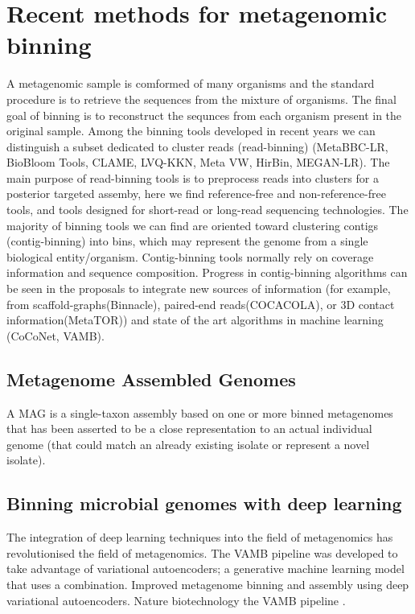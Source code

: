 \documentclass{article}
\begin{document}
\section*{Recent methods for metagenomic binning}
A metagenomic sample is comformed of many organisms and the standard procedure is to retrieve the sequences from the mixture of organisms.
The final goal of binning is to reconstruct the sequnces from each organism present in the original sample.
Among the binning tools developed in recent years we can distinguish a subset dedicated to cluster reads (read-binning) (MetaBBC-LR, BioBloom Tools, CLAME, LVQ-KKN, Meta VW, HirBin, MEGAN-LR).
The main purpose of read-binning tools is to preprocess reads into clusters for a posterior targeted assemby, here we find reference-free and non-reference-free tools, and tools designed for short-read or long-read sequencing technologies.
The majority of binning tools we can find are oriented toward clustering contigs (contig-binning) into bins, which may represent the genome from a single biological entity/organism.
Contig-binning tools normally rely on coverage information and sequence composition.
Progress in contig-binning algorithms can be seen in the proposals to integrate new sources of information (for example, from scaffold-graphs(Binnacle), paired-end reads(COCACOLA), or 3D contact information(MetaTOR)) and state of the art algorithms in machine learning (CoCoNet, \gls{VAMB}).

\subsection*{Metagenome Assembled Genomes}
A \gls{MAG} is a single-taxon assembly based on one or more binned metagenomes that has been asserted to be a close representation to an actual individual genome (that could match an already existing isolate or represent a novel isolate).

\subsection*{Binning microbial genomes with deep learning}
The integration of deep learning techniques into the field of metagenomics has revolutionised the field of metagenomics.
The \gls{VAMB} pipeline was developed to take advantage of variational autoencoders; a generative machine learning model that uses a combination.
Improved metagenome binning and assembly using deep variational autoencoders.
Nature biotechnology the \gls{VAMB} pipeline \cite{nissenimproved}.
\end{document}
